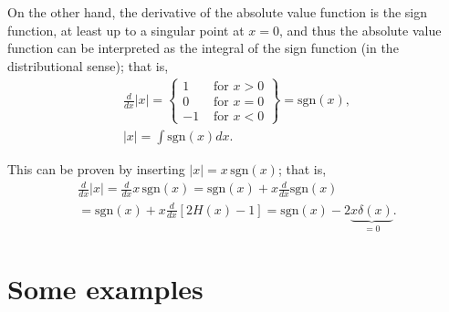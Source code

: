 On the other hand, the derivative of the absolute value function is the sign function, at least up to a singular point at $x=0$,
and thus the absolute value function can be interpreted as the integral of the sign function (in the distributional sense);
that is,
\begin{equation}
\begin{split}
\frac{d }{dx} \left|x\right| =
\left\{
\begin{array}{rl}
1&\textrm{ for } x > 0\\
0&\textrm{ for } x = 0\\
-1&\textrm{ for } x < 0
\end{array}
\right\}
=
\textrm{sgn} (x)
,\\
\left|x\right| =  \int \textrm{sgn} (x) dx.
\end{split}
 \end{equation}

{\color{OliveGreen}
\bproof
This can  be proven by inserting
$\left|x\right|  =  {x}\, \textrm{sgn} (x)$; that is,
\begin{equation}
\begin{split}
\frac{d }{dx}  \left|x\right|
=
\frac{d }{dx}x\,\textrm{sgn} (x)
=
\textrm{sgn} (x)  + x\frac{d}{dx} \textrm{sgn} (x)
\\
=
\textrm{sgn} (x)  + x\frac{d }{dx}\left[2H(x)-1\right]
=
\textrm{sgn} (x) - 2\underbrace{x\delta(x)}_{=0}.
\end{split}
 \end{equation}

\eproof
}



\section{Some examples}

